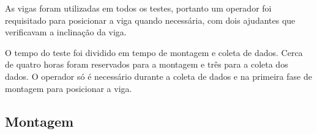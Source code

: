 As vigas foram utilizadas em todos os testes, portanto um operador foi
requisitado para posicionar a viga quando necessária, com dois ajudantes que
verificavam a inclinação da viga.

O tempo do teste foi dividido em tempo de montagem e coleta de dados. Cerca de
quatro horas foram reservados para a montagem e três para a coleta dos dados.
O operador só é necessário durante a coleta de dados e na primeira fase de
montagem para posicionar a viga.

\subsection{Montagem}

\label{metodos}


